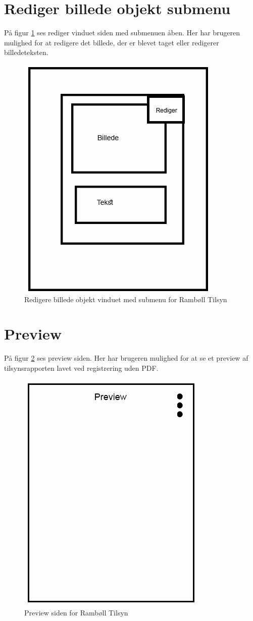 \section{Rediger billede objekt submenu}\label{sec:RedigerBilledeSubMock}
På figur \ref{fig:RedigerBilledeSubMock} ses rediger vinduet siden med submenuen åben. Her har brugeren mulighed for at redigere det billede, der er blevet taget eller redigerer billedeteksten.

\begin{figure}[H]
	\centering
	\includegraphics[width=0.4\linewidth]{MockUps/Mock/Ramboell-RedigerBilledeOpbjekt-Sub}
	\caption{Redigere billede objekt vinduet med submenu for Rambøll Tilsyn}
	\label{fig:RedigerBilledeSubMock}
\end{figure}

\clearpage

\section{Preview}\label{sec:PreviewMock}
På figur \ref{fig:PreviewMock} ses preview siden. Her har brugeren mulighed for at se et preview af tilsynsrapporten lavet ved registrering uden PDF.

\begin{figure}[H]
	\centering
	\includegraphics[width=0.4\linewidth]{MockUps/Mock/Ramboell-Preview}
	\caption{Preview siden for Rambøll Tilsyn}
	\label{fig:PreviewMock}
\end{figure}

